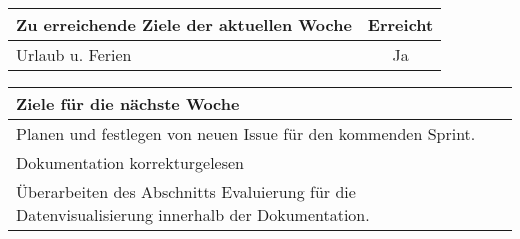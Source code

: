 \begin{tabularx}{\textwidth}{Xc}
    \arrayrulecolor{OliveGreen}
    \toprule
    {\bfseries Zu erreichende Ziele der aktuellen Woche} & {\bfseries Erreicht} \\
    \midrule[2pt]
    Urlaub u. Ferien &Ja              \\
    \bottomrule[2pt]
\end{tabularx}
%
\vspace{1cm}
%
\begin{tabularx}{\textwidth}{Xc}
    \arrayrulecolor{OliveGreen}
    \toprule
    {\bfseries Ziele für die nächste Woche}        &                         \\
    \midrule[2pt]
    Planen und festlegen von neuen Issue für den kommenden Sprint.    &       \\
    \rowcolor{OliveGreen!15}
    Dokumentation korrekturgelesen                     &                    \\
    \rowcolor{White}
    Überarbeiten des Abschnitts Evaluierung für die Datenvisualisierung
    innerhalb der Dokumentation. & \\
\end{tabularx}
